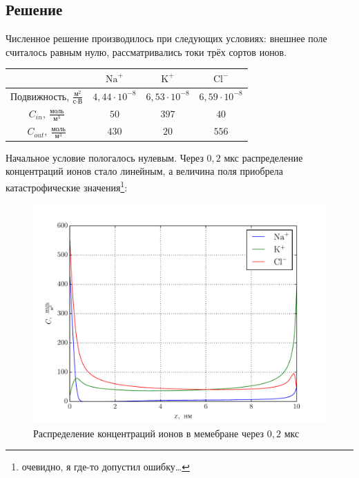 \documentclass{hedwork}
\begin{document}
\subsection{Решение}
Численное решение производилось при следующих условиях: внешнее поле считалось
равным нулю, рассматривались токи трёх сортов ионов.
\begin{table}[h]
    \center
    \begin{tabular}{|c|c|c|c|}\hline
        & \( \mathrm{Na}^+ \) & \( \mathrm{K}^+ \) & \( \mathrm{Cl}^- \) \\
        \hline
        Подвижность, \( \frac{\text{м}^2}{\text{с}\cdot\text{В}} \)
        & \( 4,\!44\cdot10^{-8} \) & \( 6,\!53\cdot10^{-8} \)
        & \( 6,\!59\cdot10^{-8} \) \\ \hline
        \( C_{in},\ \frac{\text{моль}}{\text{м}^3} \)
        & \( 50 \) & \( 397 \) & \( 40 \) \\ \hline
        \( C_{out},\ \frac{\text{моль}}{\text{м}^3} \)
        & \( 430 \) & \( 20 \) & \( 556 \) \\ \hline
    \end{tabular}
\end{table}
Начальное условие пологалось нулевым. Через \( 0,\!2 \) мкс
распределение концентраций ионов стало линейным, а величина поля
приобрела катастрофические значения\footnote{очевидно, я где-то допустил
ошибку\ldots}:
\begin{figure}[h]
\begin{center}
    \includegraphics[width=\textwidth]{plots/stat_conc}
\end{center}
\caption{Распределение концентраций ионов в мемебране через \( 0,\!2 \) мкс}
\end{figure}
\end{document}
